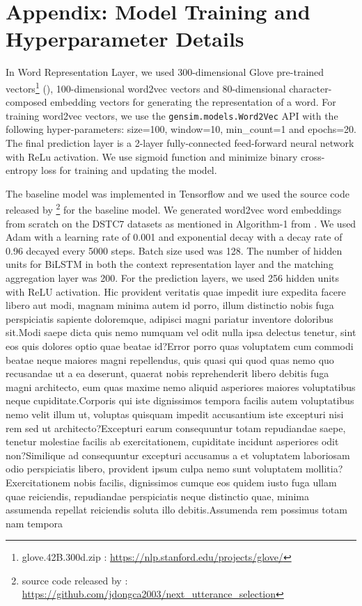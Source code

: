\documentclass[letterpaper]{article} %
\begin{document}
\section{Appendix: Model Training and Hyperparameter Details}
In Word Representation Layer, we used 300-dimensional Glove pre-trained vectors\footnote{glove.42B.300d.zip : \url{https://nlp.stanford.edu/projects/glove/}} (\cite{pennington2014glove}), 100-dimensional word2vec vectors \cite{mikolov2013efficient} and 80-dimensional character-composed embedding vectors for generating the representation of a word. For training word2vec vectors, we use the \texttt{gensim.models.Word2Vec} API with the following hyper-parameters: size=100, window=10, min\_count=1 and epochs=20. The final prediction layer is a 2-layer fully-connected feed-forward neural network with ReLu activation. We use sigmoid function and minimize binary cross-entropy loss for training and updating the model.

The baseline model was implemented in Tensorflow \cite{abadi2016tensorflow} and we used the source code released by \citeauthor{dong2018enhance} \footnote{source code released by \citeauthor{dong2018enhance} : \url{https://github.com/jdongca2003/next_utterance_selection}} for the baseline model. We generated word2vec word embeddings from scratch on the DSTC7 datasets as mentioned in Algorithm-1 from \citeauthor{dong2018enhance} . We used Adam \cite{kingma2014adam} with a learning rate of 0.001 and exponential decay with a decay rate of 0.96 decayed every 5000 steps. Batch size used was 128. The number of hidden units for BiLSTM in both the context representation layer and the matching aggregation layer was 200. For the prediction layers, we used 256 hidden units with ReLU activation.  Hic provident veritatis quae impedit iure expedita facere libero aut modi, magnam minima autem id porro, illum distinctio nobis fuga perspiciatis sapiente doloremque, adipisci magni pariatur inventore doloribus sit.Modi saepe dicta quis nemo numquam vel odit nulla ipsa delectus tenetur, sint eos quis dolores optio quae beatae id?Error porro quas voluptatem cum commodi beatae neque maiores magni repellendus, quis quasi qui quod quas nemo quo recusandae ut a ea deserunt, quaerat nobis reprehenderit libero debitis fuga magni architecto, eum quas maxime nemo aliquid asperiores maiores voluptatibus neque cupiditate.Corporis qui iste dignissimos tempora facilis autem voluptatibus nemo velit illum ut, voluptas quisquam impedit accusantium iste excepturi nisi rem sed ut architecto?Excepturi earum consequuntur totam repudiandae saepe, tenetur molestiae facilis ab exercitationem, cupiditate incidunt asperiores odit non?Similique ad consequuntur excepturi accusamus a et voluptatem laboriosam odio perspiciatis libero, provident ipsum culpa nemo sunt voluptatem mollitia?Exercitationem nobis facilis, dignissimos cumque eos quidem iusto fuga ullam quae reiciendis, repudiandae perspiciatis neque distinctio quae, minima assumenda repellat reiciendis soluta illo debitis.Assumenda rem possimus totam nam tempora


\end{document}
